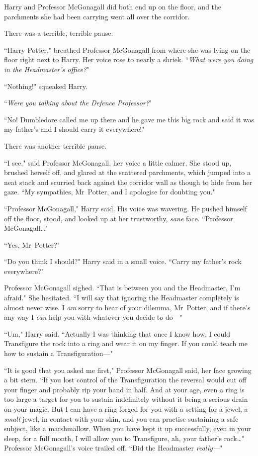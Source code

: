 Harry and Professor McGonagall did both end up on the floor, and the parchments she had been carrying went all over the corridor.

There was a terrible, terrible pause.

``Harry Potter," breathed Professor McGonagall from where she was lying on the floor right next to Harry. Her voice rose to nearly a shriek. ``\emph{What were you doing in the Headmaster's office?}"

``Nothing!" squeaked Harry.

``\emph{Were you talking about the Defence Professor?}"

``No! Dumbledore called me up there and he gave me this big rock and said it was my father's and I should carry it everywhere!"

There was another terrible pause.

``I see," said Professor McGonagall, her voice a little calmer. She stood up, brushed herself off, and glared at the scattered parchments, which jumped into a neat stack and scurried back against the corridor wall as though to hide from her gaze. ``My sympathies, Mr~Potter, and I apologise for doubting you."

``Professor McGonagall," Harry said. His voice was wavering. He pushed himself off the floor, stood, and looked up at her trustworthy, \emph{sane} face. ``Professor McGonagall{\ldots}"

``Yes, Mr~Potter?"

``Do you think I should?" Harry said in a small voice. ``Carry my father's rock everywhere?"

Professor McGonagall sighed. ``That is between you and the Headmaster, I'm afraid." She hesitated. ``I will say that ignoring the Headmaster completely is almost never wise. I \emph{am} sorry to hear of your dilemma, Mr~Potter, and if there's any way I \emph{can} help you with whatever you decide to do—"

``Um," Harry said. ``Actually I was thinking that once I know how, I could Transfigure the rock into a ring and wear it on my finger. If you could teach me how to sustain a Transfiguration—"

``It is good that you asked me first," Professor McGonagall said, her face growing a bit stern. ``If you lost control of the Transfiguration the reversal would cut off your finger and probably rip your hand in half. And at your age, even a ring is too large a target for you to sustain indefinitely without it being a serious drain on your magic. But I can have a ring forged for you with a setting for a jewel, a \emph{small} jewel, in contact with your skin, and you can practise sustaining a safe subject, like a marshmallow. When you have kept it up successfully, even in your sleep, for a full month, I will allow you to Transfigure, ah, your father's rock{\ldots}" Professor McGonagall's voice trailed off. ``Did the Headmaster \emph{really—}"

